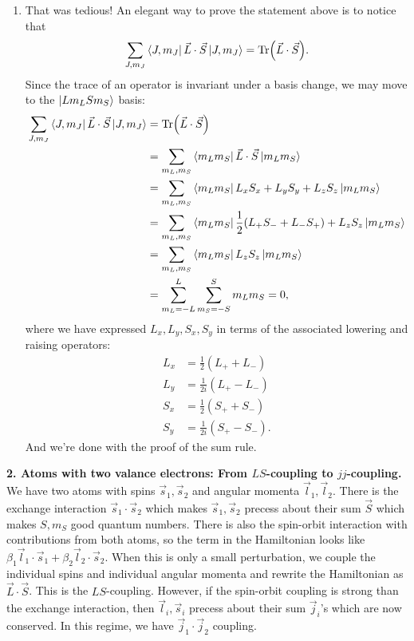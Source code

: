 \documentclass{article}
\theoremstyle{definition}
\newcommand{\be}{\beta}
\newcommand{\f}[2]{\frac{#1}{#2}}
\begin{document}
\begin{enumerate}[label=(\alph*)]
	\item  That was tedious! An elegant way to prove the statement above is to notice that 
	\begin{align*}
	\sum_{J,m_J} \bra{J,m_J} \vec{L}\cdot \vec{S} \ket{J,m_J} = \Tr(\vec{L}\cdot \vec{S}).
	\end{align*}
	Since the trace of an operator is invariant under a basis change, we may move to the $\ket{Lm_L S m_S}$ basis: 
	\begin{align*}
	\sum_{J,m_J} \bra{J,m_J} \vec{L}\cdot \vec{S} \ket{J,m_J} &= \Tr(\vec{L}\cdot \vec{S}) \\
	&= \sum_{m_L,m_S} \bra{m_L m_S} \vec{L}\cdot \vec{S} \ket{m_L m_S} \\
	&= \sum_{m_L,m_S} \bra{m_L m_S} L_xS_x+L_yS_y+L_zS_z \ket{m_L m_S} \\
	&= \sum_{m_L,m_S} \bra{m_L m_S} \f{1}{2}(L_+S_- + L_-S_+)   +L_zS_z \ket{m_L m_S} \\
	&= \sum_{m_L,m_S} \bra{m_L m_S} L_zS_z \ket{m_L m_S} \\
	&= \sum_{m_L=-L}^L\sum_{m_S=-S}^S m_L m_S = 0,
	\end{align*} 
	where we have expressed $L_x,L_y,S_x,S_y$ in terms of the associated lowering and raising operators:
	\begin{align*}
	L_x &= \f{1}{2}(L_+ + L_-)\\
	L_y &= \f{1}{2i}(L_+ - L_-)\\
	S_x &= \f{1}{2}(S_+ + S_-)\\
	S_y &= \f{1}{2i}(S_+ - S_-).
	\end{align*}
	And we're done with the proof of the sum rule. 
\end{enumerate}

\noindent \textbf{2. Atoms with two valance electrons: From $LS$-coupling to $jj$-coupling.} We have two atoms with spins $\vec{s}_1,\vec{s}_2$ and angular momenta $\vec{l}_1, \vec{l}_2$. There is the exchange interaction $\vec{s}_1 \cdot \vec{s}_2$ which makes $\vec{s}_1, \vec{s}_2$ precess about their sum $\vec{S}$ which makes $S,m_S$ good quantum numbers. There is also the spin-orbit interaction with contributions from both atoms, so the term in the Hamiltonian looks like $\be_1 \vec{l}_1 \cdot \vec{s}_1 + \be_2 \vec{l}_2 \cdot \vec{s}_2$. When this is only a small perturbation, we couple the individual spins and individual angular momenta and rewrite the Hamiltonian as $\vec{L}\cdot \vec{S}$. This is the $LS$-coupling.  However, if the spin-orbit coupling is strong than the exchange interaction, then $\vec{l}_i, \vec{s}_i$ precess about their sum $\vec{j}_i$'s which are now conserved. In this regime, we have $\vec{j}_1 \cdot \vec{j}_2$ coupling.  \\
\end{document}
